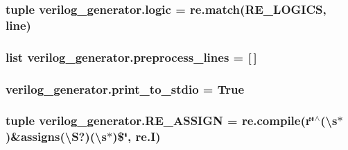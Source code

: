 \hypertarget{namespaceverilog__generator_a2e8bc766afc3a7055490c6df1b89960f}{
\subsubsection[{logic}]{\setlength{\rightskip}{0pt plus 5cm}tuple verilog\-\_\-generator.\-logic = re.\-match({\bf R\-E\-\_\-\-L\-O\-G\-I\-C\-S}, line)}}\label{namespaceverilog__generator_a2e8bc766afc3a7055490c6df1b89960f}
\hypertarget{namespaceverilog__generator_ad5eb8554969365fa9ee5b1fb34933f60}{
\subsubsection[{preprocess\-\_\-lines}]{\setlength{\rightskip}{0pt plus 5cm}list verilog\-\_\-generator.\-preprocess\-\_\-lines = \mbox{[}$\,$\mbox{]}}}\label{namespaceverilog__generator_ad5eb8554969365fa9ee5b1fb34933f60}
\hypertarget{namespaceverilog__generator_ae2b00ab6926aace302d17acbfc4b4930}{
\subsubsection[{print\-\_\-to\-\_\-stdio}]{\setlength{\rightskip}{0pt plus 5cm}verilog\-\_\-generator.\-print\-\_\-to\-\_\-stdio = True}}\label{namespaceverilog__generator_ae2b00ab6926aace302d17acbfc4b4930}
\hypertarget{namespaceverilog__generator_ac99e807a3e07ae1108785072dc553db5}{
\subsubsection[{R\-E\-\_\-\-A\-S\-S\-I\-G\-N}]{\setlength{\rightskip}{0pt plus 5cm}tuple verilog\-\_\-generator.\-R\-E\-\_\-\-A\-S\-S\-I\-G\-N = re.\-compile(r\char`\"{}$^\wedge$(\textbackslash{}s$\ast$)\&assigns(\textbackslash{}S?)(\textbackslash{}s$\ast$)\$\char`\"{}, re.\-I)}}\label{namespaceverilog__generator_ac99e807a3e07ae1108785072dc553db5}
